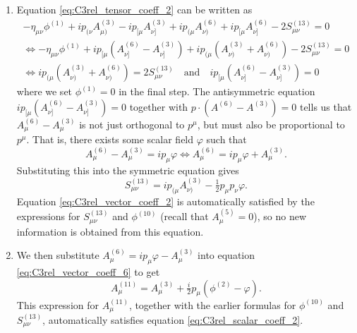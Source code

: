 \documentclass[11pt,reqno,a4paper,final]{amsart}
\theoremstyle{plain}
\theoremstyle{definition}
\newcommand{\phisup}[1]{\phi^{(#1)}}
\newcommand{\Asup}[1]{A^{(#1)}}
\newcommand{\1}{\mathbb{1}}
\numberwithin{equation}{section}
\begin{document}
\begin{appendices}
\begin{enumerate}
    \begin{enumerate}
        \item $p\cdot(\Asup{6} - \Asup{3}) = 0$
        \item $\boxed{\phisup{10} = \tfrac i2 p \cdot \Asup{6} = \tfrac i2 p \cdot \Asup{3}}$
    \end{enumerate}
    \item Equation \eqref{eq:C3rel_tensor_coeff_2}
    can be written as 
    \begin{equation*}
        \begin{split}
           -\eta_{\mu\nu} \phisup{1} + ip_{(\nu}\Asup{3}_{\mu)} - ip_{[\mu}\Asup{3}_{\nu]} + ip_{(\mu} \Asup{6}_{\nu)} + ip_{[\mu} \Asup{6}_{\nu]} - 2S^{(13)}_{\mu\nu} = 0 \\
           \iff -\eta_{\mu\nu} \phisup{1} + ip_{[\mu} (\Asup{6}_{\nu]} - \Asup{3}_{\nu]}) + ip_{(\mu} (\Asup{3}_{\nu)} + \Asup{6}_{\nu)})  - 2S^{(13)}_{\mu\nu} = 0 \\
           \iff  ip_{(\mu} (\Asup{3}_{\nu)} + \Asup{6}_{\nu)})  = 2S^{(13)}_{\mu\nu} \quad \text{and} \quad  ip_{[\mu} (\Asup{6}_{\nu]} - \Asup{3}_{\nu]}) = 0
        \end{split}
    \end{equation*}
    where we set $\phisup{1} = 0$ in the final step.
    The antisymmetric equation $ip_{[\mu} (\Asup{6}_{\nu]} - \Asup{3}_{\nu]}) = 0$ together with $p \cdot (\Asup{6} - \Asup{3}) = 0$ tells us that $\Asup{6}_\mu - \Asup{3}_\mu$ is not just orthogonal to $p^\mu$, but must also be proportional to $p^\mu$. That is, there exists some scalar field $\varphi$ such that $$\Asup{6}_\mu - \Asup{3}_\mu = i p_\mu \varphi \iff \boxed{\Asup{6}_\mu = i p_\mu \varphi + \Asup{3}_\mu}.$$
    Substituting this into the symmetric equation gives
   $$\boxed{S^{(13)}_{\mu\nu} = ip_{(\mu}\Asup{3}_{\nu)} - \tfrac12 p_\mu p_\nu \varphi.}$$
   Equation \eqref{eq:C3rel_vector_coeff_2} is automatically satisfied by the expressions for $S^{(13)}_{\mu\nu}$ and $\phisup{10}$ (recall that $\Asup{5}_\mu = 0$), so no new information is obtained from this equation.
    \item We then substitute $\Asup{6}_\mu = i p_\mu \varphi - \Asup{3}_\mu$ into equation \eqref{eq:C3rel_vector_coeff_6} to get
    $$\boxed{\Asup{11}_\mu =  \Asup{3}_\mu + \tfrac i2 p_\mu (\phisup{2} - \varphi).}$$
    This expression for $\Asup{11}_\mu$, together with the earlier formulas for $\phisup{10}$ and $S^{(13)}_{\mu\nu}$, automatically satisfies equation \eqref{eq:C3rel_scalar_coeff_2}.

\end{enumerate}
\end{appendices}
\end{document}
